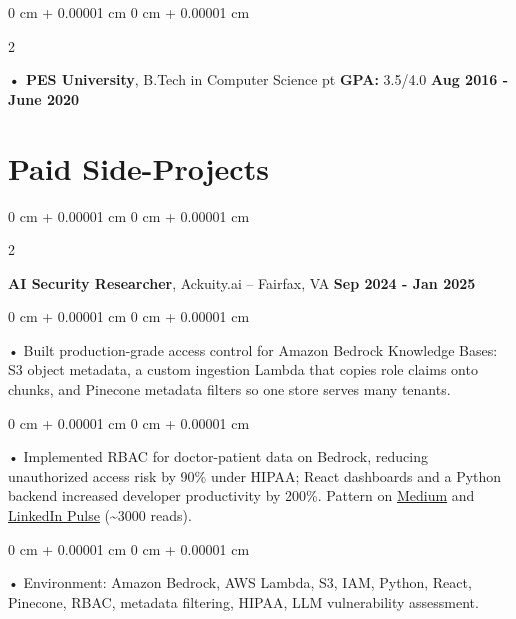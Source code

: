 \documentclass[10pt, letterpaper]{article}
\newenvironment{onecolentry}{
    \begin{adjustwidth}{
        0 cm + 0.00001 cm
    }{
        0 cm + 0.00001 cm
    }
}{
    \end{adjustwidth}
} %
\newenvironment{twocolentry}[2][]{
    \onecolentry
    \def\secondColumn{#2}
    \setcolumnwidth{\fill, 4.5 cm}
    \begin{paracol}{2}
}{
    \switchcolumn \raggedleft \secondColumn
    \end{paracol}
    \endonecolentry
} %
\begin{document}
        \begin{twocolentry}{
            \textbf{Aug 2016 - June 2020}
        }
            \textbf{ • PES University}, B.Tech in Computer Science  pt \textbf{GPA:} 3.5/4.0  \end{twocolentry}

    \vspace{0.08cm}
    \section{Paid Side-Projects}
            \vspace{2 pt }
                    \begin{twocolentry}{
            \textbf{Sep 2024 - Jan 2025}
        }
            \textbf{AI Security Researcher}, Ackuity.ai -- Fairfax, VA\end{twocolentry}

        \begin{onecolentry}
             • Built production-grade access control for Amazon Bedrock Knowledge Bases: S3 object metadata, a custom ingestion Lambda that copies role claims onto chunks, and Pinecone metadata filters so one store serves many tenants.
        \end{onecolentry}
        \begin{onecolentry}
             • Implemented RBAC for doctor-patient data on Bedrock, reducing unauthorized access risk by 90\% under HIPAA; React dashboards and a Python backend increased developer productivity by 200\%. Pattern on \href{https://medium.com/@sreenikethaathreya/building-a-permission-aware-genai-application-on-amazon-bedrock-8fdc2410dd43}{Medium} and \href{https://www.linkedin.com/pulse/building-permission-aware-genai-application-amazon-bedrock-aathreya-g7nme/}{LinkedIn Pulse} (\textasciitilde 3000 reads).
        \end{onecolentry}
        \begin{onecolentry}
             • Environment: Amazon Bedrock, AWS Lambda, S3, IAM, Python, React, Pinecone, RBAC, metadata filtering, HIPAA, LLM vulnerability assessment.
        \end{onecolentry}
\end{document}
